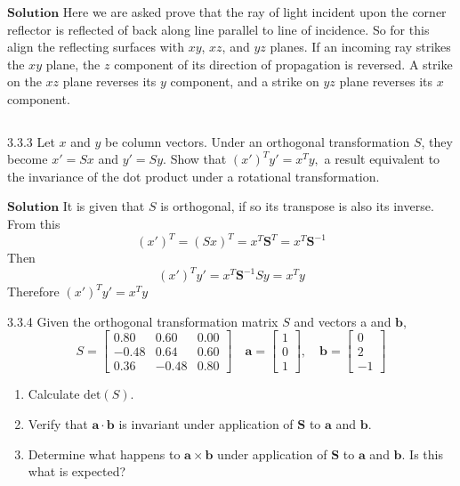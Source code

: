 \documentclass{article}
\begin{document}
\begin{flushleft}
$\boxed{\textbf{Solution}}$ Here we are asked prove that the ray of light incident upon the corner reflector is reflected of back along line parallel to line of incidence.
So for this align the reflecting surfaces with $xy$, $xz$, and $yz$ planes. If an incoming ray strikes the $xy$ plane, the $z$ component of its direction of propagation is reversed. A strike on the $xz$ plane
reverses its $y$ component, and a strike on $yz$ plane reverses its $x$ component.

$$$$

\begin{mybox}{3.3.3}
Let $x$ and $y$ be column vectors. Under an orthogonal transformation $S$, they become
$x'=S x$ and $y'=S y .$ Show that $\left(x'\right)^{T} y'=x^{T} y,$ a result equivalent to the invariance of the dot product under a rotational transformation.
\end{mybox}

$\boxed{\textbf{Solution}}$ It is given that $S$ is orthogonal, if so its transpose is also its inverse.
From this
$$
\left(x'\right)^{T}=(S x)^{T}=x^{T} \mathbf{S}^{T}=x^{T} \mathbf{S}^{-1}
$$
Then
$$
\left(x'\right)^{T} y'=x^{T} \mathbf{S}^{-1} S y=x^{T} y
$$
Therefore $\left(x'\right)^{T} y'=x^{T} y$


\newpage


\begin{mybox}{3.3.4}
Given the orthogonal transformation matrix $S$ and vectors a and $\mathbf{b}$, 
$$S=\begin{bmatrix}{0.80} & {0.60} & {0.00} \\ {-0.48} & {0.64} & {0.60} \\ {0.36} & {-0.48} & {0.80}\end{bmatrix} \quad \mathbf{a}=\begin{bmatrix}{1} \\ {0} \\ {1}\end{bmatrix}, \quad \mathbf{b}=\begin{bmatrix}{0} \\ {2} \\ {-1}\end{bmatrix}$$
\begin{enumerate}[$(a)$]
\item Calculate $\text{det}(S)$.
\item Verify that $\mathbf{a}\cdot \mathbf{b}$ is invariant under application of $\mathbf{S}$ to $\mathbf{a}$ and $\mathbf{b}$.
\item Determine what happens to $\mathbf{a}\times \mathbf{b}$ under application of $\mathbf{S}$ to $\mathbf{a}$ and $\mathbf{b}$. Is this what is expected?
\end{enumerate}
\end{mybox}


\end{flushleft}
\end{document}
